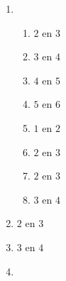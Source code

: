 {\begin{multicols}{3}
\begin{enumerate}[noitemsep, label=\textbf{\arabic*}. ]
\item %

    \begin{enumerate}[noitemsep, label=\textbf{(\alph*)} ] 
\item $2$ en $3$
\item $3$ en $4$
\item $4$ en $5$
\item $5$ en $6$
\item $1$ en $2$
\item $2$ en $3$
\item $2$ en $3$
\item $3$ en $4$
    \end{enumerate}


\item $2$ en $3$%
\item $3$ en $4$%

\item %


\end{enumerate}
\end{multicols}}
